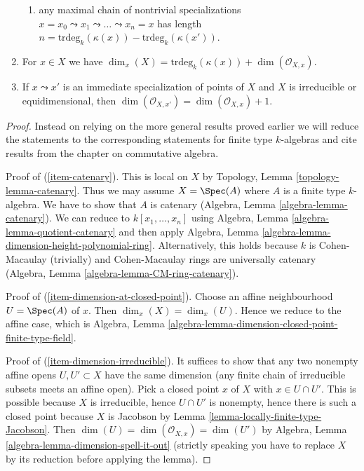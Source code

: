 \begin{lemma}
\begin{enumerate}
\begin{enumerate}
\item any maximal chain of nontrivial specializations
$x = x_0 \leadsto x_1 \leadsto \ldots \leadsto x_n = x$ has
length $n = \text{trdeg}_k(\kappa(x)) - \text{trdeg}_k(\kappa(x'))$.
\end{enumerate}
\item
\label{item-dimension-formula}
For $x \in X$ we have
$\dim_x(X) = \text{trdeg}_k(\kappa(x)) + \dim(\mathcal{O}_{X, x})$.
\item
\label{item-immediate-specialization-local-ring}
If $x \leadsto x'$ is an immediate specialization
of points of $X$ and $X$ is irreducible or equidimensional, then
$\dim(\mathcal{O}_{X, x'}) = \dim(\mathcal{O}_{X, x}) + 1$.
\end{enumerate}
\end{lemma}

\begin{proof}
Instead on relying on the more general results proved earlier
we will reduce the statements to the corresponding statements
for finite type $k$-algebras and cite results from the chapter
on commutative algebra.

\medskip\noindent
Proof of (\ref{item-catenary}). This is local on $X$ by
Topology, Lemma \ref{topology-lemma-catenary}. Thus we may
assume $X = \Spec(A)$ where $A$ is a finite type $k$-algebra.
We have to show that $A$ is catenary
(Algebra, Lemma \ref{algebra-lemma-catenary}).
We can reduce to $k[x_1, \ldots, x_n]$ using
Algebra, Lemma \ref{algebra-lemma-quotient-catenary} and then apply
Algebra, Lemma \ref{algebra-lemma-dimension-height-polynomial-ring}.
Alternatively, this holds because $k$ is Cohen-Macaulay (trivially) and
Cohen-Macaulay rings are universally catenary
(Algebra, Lemma \ref{algebra-lemma-CM-ring-catenary}).

\medskip\noindent
Proof of (\ref{item-dimension-at-closed-point}). Choose an affine
neighbourhood $U = \Spec(A)$ of $x$. Then $\dim_x(X) = \dim_x(U)$.
Hence we reduce to the affine case, which is
Algebra, Lemma \ref{algebra-lemma-dimension-closed-point-finite-type-field}.

\medskip\noindent
Proof of (\ref{item-dimension-irreducible}). It suffices to show that
any two nonempty affine opens $U, U' \subset X$ have the same dimension
(any finite chain of irreducible subsets meets an affine open).
Pick a closed point $x$ of $X$ with $x \in U \cap U'$. This is possible
because $X$ is irreducible, hence $U \cap U'$ is nonempty, hence there is
such a closed point because $X$ is Jacobson by
Lemma \ref{lemma-locally-finite-type-Jacobson}. Then
$\dim(U) = \dim(\mathcal{O}_{X, x}) = \dim(U')$ by
Algebra, Lemma \ref{algebra-lemma-dimension-spell-it-out}
(strictly speaking you have to replace $X$ by its reduction before
applying the lemma).


\end{proof}
